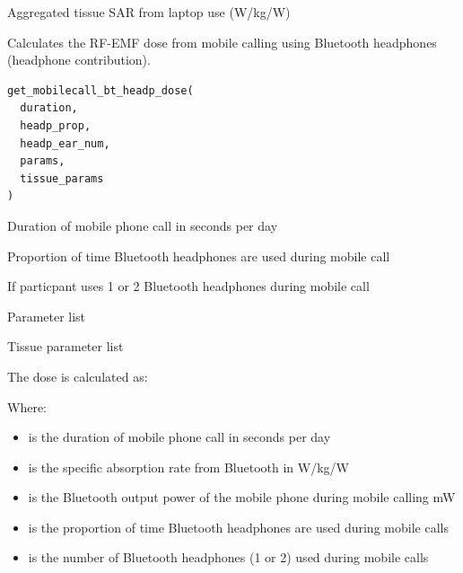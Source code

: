 \documentclass[a4paper]{book}
\begin{document}
%
\begin{Value}
Aggregated tissue SAR from laptop use (W/kg/W)
\end{Value}
%
\begin{Description}
Calculates the RF-EMF dose from mobile calling using Bluetooth headphones (headphone contribution).
\end{Description}
%
\begin{Usage}
\begin{verbatim}
get_mobilecall_bt_headp_dose(
  duration,
  headp_prop,
  headp_ear_num,
  params,
  tissue_params
)
\end{verbatim}
\end{Usage}
%
\begin{Arguments}
\begin{ldescription}
\item[\code{duration}] Duration of mobile phone call in seconds per day

\item[\code{headp\_prop}] Proportion of time Bluetooth headphones are used during mobile call

\item[\code{headp\_ear\_num}] If particpant uses 1 or 2 Bluetooth headphones during mobile call

\item[\code{params}] Parameter list

\item[\code{tissue\_params}] Tissue parameter list
\end{ldescription}
\end{Arguments}
%
\begin{Details}
The dose is calculated as:

Where:
\begin{itemize}

\item{}  is the duration of mobile phone call in seconds per day
\item{}  is the specific absorption rate from Bluetooth in W/kg/W
\item{}  is the Bluetooth output power of the mobile phone during mobile calling mW
\item{}  is the proportion of time Bluetooth headphones are used during mobile calls
\item{}  is the number of Bluetooth headphones (1 or 2) used during mobile calls

\end{itemize}

\end{Details}
\end{document}
